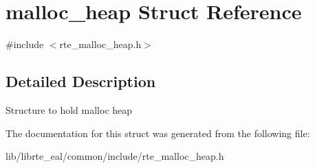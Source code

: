 \hypertarget{structmalloc__heap}{}\section{malloc\+\_\+heap Struct Reference}
\label{structmalloc__heap}


{\ttfamily \#include $<$rte\+\_\+malloc\+\_\+heap.\+h$>$}



\subsection{Detailed Description}
Structure to hold malloc heap 

The documentation for this struct was generated from the following file\+:\begin{DoxyCompactItemize}
\item 
lib/librte\+\_\+eal/common/include/rte\+\_\+malloc\+\_\+heap.\+h\end{DoxyCompactItemize}
